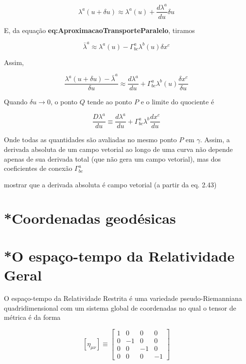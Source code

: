 \[
\lambda^{a}(u+\delta u) \approx \lambda^{a}(u)+\frac{d \lambda^{a}}{d u} \delta u
\]

E, da equação \textbf{eq:AproximacaoTransporteParalelo}, tiramos

\[
\bar{\lambda}^{a} \approx \lambda^{a}(u)-\Gamma_{b c}^{a} \lambda^{b}(u) \delta x^{c}
\]

Assim,

\[
\frac{\lambda^{a}(u+\delta u)-\bar{\lambda}^{a}}{\delta u} \approx \frac{d \lambda^{a}}{d u}+\Gamma_{b c}^{a} \lambda^{b}(u) \frac{\delta x^{c}}{\delta u}
\]

Quando $ \delta u \rightarrow 0 $, o ponto $ Q $ tende ao ponto $ P $ e o limite do quociente é 

\begin{equation}\label{eq:DerivadaAbsolutaDefinicao}
\boxed{
\frac{D \lambda^{a}}{d u} \equiv \frac{d \lambda^{a}}{d u}+\Gamma_{b c}^{a} \lambda^{b} \frac{d x^{c}}{d u}
}
\end{equation}

Onde todas as quantidades são avaliadas no mesmo ponto $ P $ em $ \gamma $. Assim, a derivada absoluta de um campo vetorial ao longo de uma curva não depende apenas de sua derivada total (que não gera um campo vetorial), mas dos coeficientes de conexão $ \Gamma_{b c}^{a} $ 

{\color{red} mostrar que a derivada absoluta é campo vetorial (a partir da eq. 2.43)}

\section{*Coordenadas geodésicas}\label{sec:CoordenadasGeodesicas}


\section{*O espaço-tempo da Relatividade Geral}\label{sec:EspacotempoRelatividadeGeral}

O espaço-tempo da Relatividade Restrita é uma variedade pseudo-Riemanniana quadridimensional com um sistema global de coordenadas no qual o tensor de métrica é da forma

\[
\left[\eta_{\mu \nu}\right] \equiv\left[\begin{array}{rrrr}{1} & {0} & {0} & {0} \\ {0} & {-1} & {0} & {0} \\ {0} & {0} & {-1} & {0} \\ {0} & {0} & {0} & {-1}\end{array}\right]
\]


